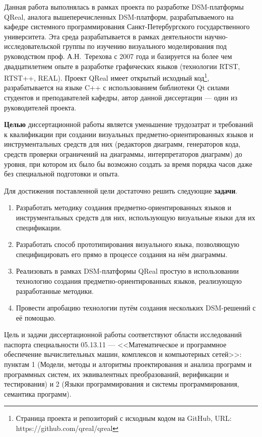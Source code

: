 Данная работа выполнялась в рамках проекта по разработке DSM-платформы QReal, аналога
вышеперечисленных DSM-платформ, разрабатываемого на кафедре системного программирования
Санкт-Петербургского государственного университета. Эта среда разрабатывается в рамках 
деятельности научно-исследовательской группы по изучению визуального моделирования 
под руководством проф. А.Н.~Терехова с 2007 года и базируется на более чем двадцатилетнем 
опыте в разработке графических языков (технологии RTST, RTST++, REAL). Проект QReal имеет 
открытый исходный код\footnote{Страница проекта и репозиторий с исходным кодом на GitHub, URL: https://github.com/qreal/qreal}, 
разрабатывается на языке C++ с использованием библиотеки Qt силами студентов и преподавателей 
кафедры, автор данной диссертации --- один из руководителей проекта.

\textbf{Целью} диссертационной работы является уменьшение трудозатрат и требований к квалификации
при создании визуальных предметно-ориентированных языков и инструментальных средств для них (редакторов диаграмм, 
генераторов кода, средств проверки ограничений на диаграммы, интерпретаторов диаграмм)
до уровня, при котором их было бы возможно создать за время порядка часов даже без 
специальной подготовки и опыта.

Для достижения поставленной цели достаточно решить следующие \textbf{задачи}.
\begin{enumerate}
	\item Разработать методику создания предметно-ориентированных языков и инструментальных 
		средств для них, использующую визуальные языки для их спецификации.
	\item Разработать способ прототипирования визуального языка, позволяющую специфицировать его
		прямо в процессе создания на нём диаграммы.
	\item Реализовать в рамках DSM-платформы QReal простую в использовании технологию 
		создания предметно-ориентированных языков, реализующую разработанные методики.
	\item Провести апробацию технологии путём создания нескольких DSM-решений с её помощью.
\end{enumerate}

Цель и задачи диссертационной работы соответствуют области исследований паспорта специальности 
05.13.11 --- <<Математическое и программное обеспечение вычислительных машин, комплексов и компьютерных сетей>>: 
пунктам 1 (Модели, методы и алгоритмы проектирования и анализа программ и программных 
систем, их эквивалентных преобразований, верификации и тестирования) и 2 (Языки программирования 
и системы программирования, семантика программ).

